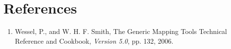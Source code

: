 \documentclass{report}
\begin{document}
\chapter{References} 
\thispagestyle{headings}

\begin{enumerate}

\item Wessel, P., and W. H. F. Smith, The Generic Mapping Tools Technical Reference and Cookbook,
{\it Version 5.0}, pp. 132, 2006.

\end{enumerate}

\clearpage
\thispagestyle{headings}
\printindex
\thispagestyle{headings}
\end{document}

